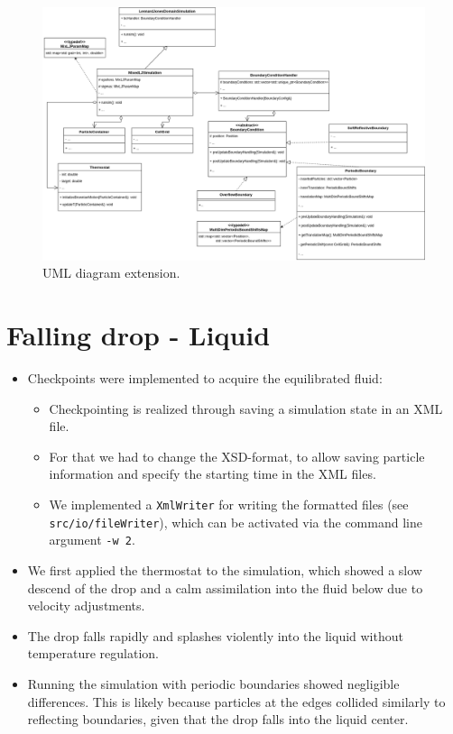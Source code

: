 \documentclass{article}
\begin{document}
\begin{figure}[H]
    \includegraphics[width=1.25\textwidth]{../../res/UML4v2.drawio}
    \caption{UML diagram extension.}
    \label{fig:uml}
\end{figure}

\section{Falling drop - Liquid}
\label{sec:drop}

    \begin{itemize}
        \item Checkpoints were implemented to acquire the equilibrated fluid:
        \begin{itemize}
            \item Checkpointing is realized through saving a simulation state in an XML file.
            \item For that we had to change the XSD-format, to allow saving particle information and specify the starting time in the XML files.
            \item We implemented a \texttt{XmlWriter} for writing the formatted files (see \texttt{src/io/fileWriter}), which can be activated via the command line argument \texttt{-w 2}.
        \end{itemize}
        \item We first applied the thermostat to the simulation, which showed a slow descend of the drop and a calm assimilation into the fluid below due to velocity adjustments.
        \item The drop falls rapidly and splashes violently into the liquid without temperature regulation.
        \item Running the simulation with periodic boundaries showed negligible differences. This is likely because particles at the edges collided similarly to reflecting boundaries, given that the drop falls into the liquid center.    \end{itemize}
\end{document}
